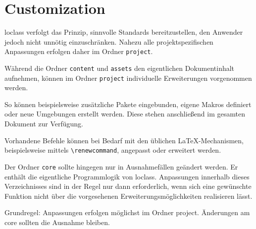 \chapter{Customization}

loclass verfolgt das Prinzip, sinnvolle Standards bereitzustellen, den Anwender jedoch nicht unnötig einzuschränken. Nahezu alle projektspezifischen Anpassungen erfolgen daher im Ordner \texttt{project}.

Während die Ordner \texttt{content} und \texttt{assets} den eigentlichen Dokumentinhalt aufnehmen, können im Ordner \texttt{project} individuelle Erweiterungen vorgenommen werden.

So können beispielsweise zusätzliche Pakete eingebunden, eigene Makros definiert oder neue Umgebungen erstellt werden. Diese stehen anschließend im gesamten Dokument zur Verfügung.

Vorhandene Befehle können bei Bedarf mit den üblichen \LaTeX{}-Mechanismen, beispielsweise mittels \texttt{\textbackslash renewcommand}, angepasst oder erweitert werden.

Der Ordner \texttt{core} sollte hingegen nur in Ausnahmefällen geändert werden. Er enthält die eigentliche Programmlogik von loclass. Anpassungen innerhalb dieses Verzeichnisses sind in der Regel nur dann erforderlich, wenn sich eine gewünschte Funktion nicht über die vorgesehenen Erweiterungsmöglichkeiten realisieren lässt.

Grundregel: Anpassungen erfolgen möglichst im Ordner project. Änderungen am core sollten die Ausnahme bleiben.
